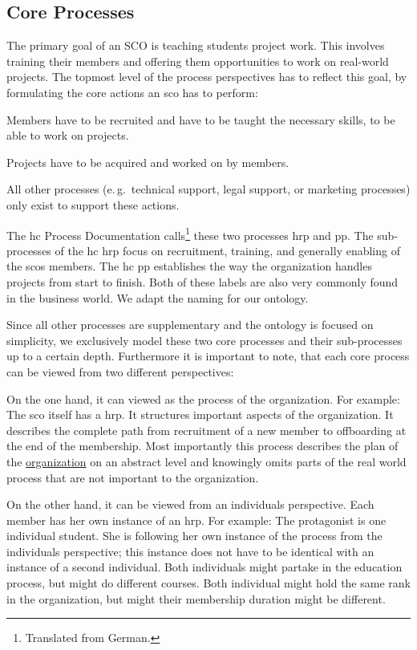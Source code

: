 \documentclass[a4paper, DIV=13, BCOR=0cm]{scrbook}
\newcommand{\eg}{e.\,g.\ }
\begin{document}
\subsection{Core Processes}
The primary goal of an SCO is teaching students project work. This involves training their members and offering them opportunities to work on real-world projects. The topmost level of the process perspectives has to reflect this goal, by formulating the core actions an \gls{sco} has to perform:
\begin{inparaenum}
	\item Members have to be recruited and have to be taught the necessary skills, to be able to work on projects.
	\item Projects have to be acquired and worked on by members.
\end{inparaenum}
All other processes (\eg technical support, legal support, or marketing processes) only exist to support these actions.

The \gls{hc} Process Documentation \cite{hc-prozesshandbuch} calls\footnote{Translated from German.} these two processes \gls{hrp} and \gls{pp}. The sub-processes of the \gls{hc} \gls{hrp} focus on recruitment, training, and generally enabling of the \glspl{sco} members. The \gls{hc} \gls{pp} establishes the way the organization handles projects from start to finish. Both of these labels are also very commonly found in the business world. We adapt the naming for our ontology.

Since all other processes are supplementary and the ontology is focused on simplicity, we exclusively model these two core processes and their sub-processes up to a certain depth. Furthermore it is important to note, that each core process can be viewed from two different perspectives:

On the one hand, it can viewed as the process of the organization. For example: The \gls{sco} itself has a \gls{hrp}. It structures important aspects of the organization. It describes the complete path from recruitment of a new member to offboarding at the end of the membership. Most importantly this process describes the plan of the \underline{organization} on an abstract level and knowingly omits parts of the real world process that are not important to the organization.

On the other hand, it can be viewed from an individuals perspective. Each member has her own instance of an \gls{hrp}. For example: The protagonist is one individual student. She is following her own instance of the process from the individuals perspective; this instance does not have to be identical with an instance of a second individual. Both individuals might partake in the education process, but might do different courses. Both individual might hold the same rank in the organization, but might their membership duration might be different.
\end{document}

